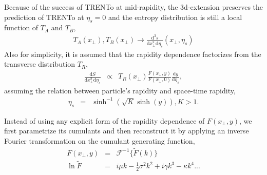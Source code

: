 \documentclass[aps,prl,twocolumn,groupedaddress]{revtex4-1}
\begin{document}
	Because of the success of TRENTo at mid-rapidity, the 3d-extension preserves the prediction of TRENTo at $\eta_s = 0$ and the entropy distribution is still a local function of $T_A$ and $T_B$,
	\begin{eqnarray}
	T_A(x_\perp), T_B(x_\perp) \rightarrow \frac{\mathrm{d^3}s}{\mathrm{d}x_{\perp}^2 \mathrm{d}\eta_s}\left(x_\perp, \eta_s\right)
	\end{eqnarray}
	Also for simplicity, it is assumed that the rapidity dependence factorizes from the transverse distribution $T_R$,
	\begin{eqnarray}
		\frac{\mathrm{d}S}{\mathrm{d}x_{\perp}^2 \mathrm{d}\eta_s}  &\propto& T_R(x_\perp) \frac{F(x_\perp,y)}{F(x_\perp,0)}\frac{\mathrm{d}y}{\mathrm{d}\eta_s},
	\end{eqnarray}
assuming the relation between particle's rapidity and space-time rapidity,
	\begin{eqnarray}
		\eta_s &=& \sinh^{-1}(\sqrt{K}\sinh(y)), K>1. 
	\end{eqnarray}
	
	Instead of using any explicit form of the rapidity dependence of $F(x_\perp, y)$, we first parametrize its cumulants and then reconstruct it by applying an inverse Fourier transformation on the cumulant generating function,
	\begin{eqnarray}
	 	F(x_\perp,y) &=& \mathcal{F}^{-1}\{\tilde{F}(k)\} \\
	 	\ln \tilde{F} &=&  i \mu k - \frac{1}{2}\sigma^2 k^2 + i 	\gamma k^3  - \kappa k^4 ...
	\end{eqnarray}
\end{document}
